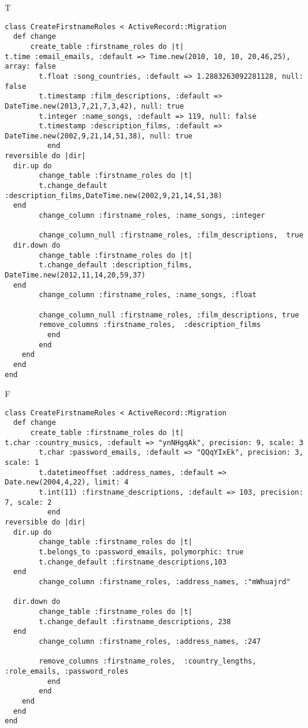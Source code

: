 T
\begin{verbatim}
class CreateFirstnameRoles < ActiveRecord::Migration
  def change
	  create_table :firstname_roles do |t|
t.time :email_emails, :default => Time.new(2010, 10, 10, 20,46,25), array: false
		t.float :song_countries, :default => 1.2883263092281128, null: false
		t.timestamp :film_descriptions, :default => DateTime.new(2013,7,21,7,3,42), null: true
		t.integer :name_songs, :default => 119, null: false
		t.timestamp :description_films, :default => DateTime.new(2002,9,21,14,51,38), null: true
		  end
reversible do |dir|
  dir.up do
		change_table :firstname_roles do |t|
		t.change_default :description_films,DateTime.new(2002,9,21,14,51,38)
  end
 		change_column :firstname_roles, :name_songs, :integer
   
		change_column_null :firstname_roles, :film_descriptions,  true
  dir.down do
		change_table :firstname_roles do |t|
		t.change_default :description_films, DateTime.new(2012,11,14,20,59,37)
  end
 		change_column :firstname_roles, :name_songs, :float
   
		change_column_null :firstname_roles, :film_descriptions, true
 		remove_columns :firstname_roles,  :description_films 
	      end
	    end
    end 
  end
end

\end{verbatim}

F
\begin{verbatim}
class CreateFirstnameRoles < ActiveRecord::Migration
  def change
	  create_table :firstname_roles do |t|
t.char :country_musics, :default => "ynNHgqAk", precision: 9, scale: 3
		t.char :password_emails, :default => "QQqYIxEk", precision: 3, scale: 1
		t.datetimeoffset :address_names, :default => Date.new(2004,4,22), limit: 4
		t.int(11) :firstname_descriptions, :default => 103, precision: 7, scale: 2
		  end
reversible do |dir|
  dir.up do
		change_table :firstname_roles do |t|
		t.belongs_to :password_emails, polymorphic: true
 		t.change_default :firstname_descriptions,103
  end
 		change_column :firstname_roles, :address_names, :"mWhuajrd"
   
  dir.down do
		change_table :firstname_roles do |t|
		t.change_default :firstname_descriptions, 238
  end
 		change_column :firstname_roles, :address_names, :247
   
		remove_columns :firstname_roles,  :country_lengths, :role_emails, :password_roles 
	      end
	    end
    end 
  end
end

\end{verbatim}

